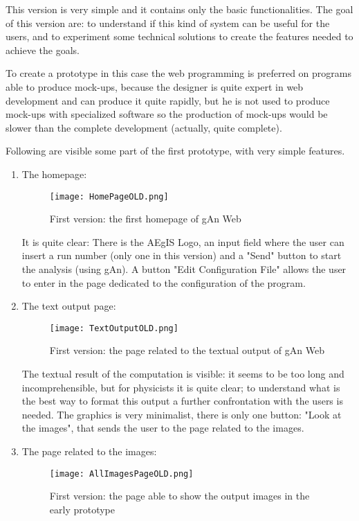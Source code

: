 This version is very simple and it contains only the basic functionalities. 
The goal of this version are: to understand if this kind of system can be useful for the users, and to experiment some technical solutions to create the features needed to achieve the goals. 

To create a prototype in this case the web programming is preferred on programs able to produce mock-ups, because the designer is quite expert in web development and can produce it quite rapidly, but he is not used to produce mock-ups with specialized software so the production of mock-ups would be slower than the complete development (actually, quite complete). 


Following are visible some part of the first prototype, with very simple features.

\begin{enumerate}
\item The homepage:

\begin{figure}[H]
\centering
\texttt{[image: HomePageOLD.png]} 
\caption{First version: the first homepage of gAn Web}
\end{figure}

It is quite clear: There is the AEgIS Logo, an input field where the user can insert a run number (only one in this version) and a "Send" button to start the analysis (using gAn). A button "Edit Configuration File" allows the user to  enter in the page dedicated to the configuration of the program.

\item The text output page:

\begin{figure}[H]
\centering
\texttt{[image: TextOutputOLD.png]} 
\caption{First version: the page related to the textual output of gAn Web}
\end{figure}
  
The textual result of the computation is visible: it seems to be too long and incomprehensible, but for physicists it is quite clear; to understand what is the best way to format this output a further confrontation with the users is needed. The graphics is very minimalist, there is only one button: "Look at the images", that sends the user to the page related to the images. 



\item The page related to the images:

\begin{figure}[H]
\centering
\texttt{[image: AllImagesPageOLD.png]}
\caption{First version: the page able to show the output images in the early prototype}
\end{figure}   


\end{enumerate}

